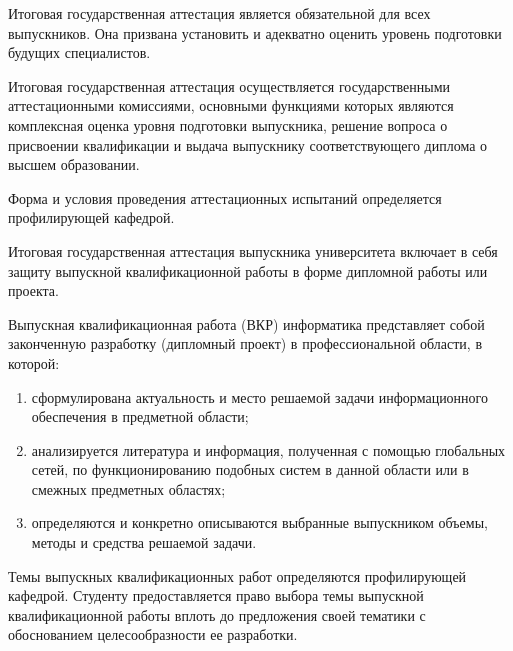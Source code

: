 \documentclass[14pt]{extarticle} %
\begin{document}
	

\renewcommand{\baselinestretch}{1.5}
\normalsize
\renewcommand{\contentsname}{СОДЕРЖАНИЕ}
\noindent\tableofcontents


Итоговая государственная аттестация является обязательной для всех выпускников. 
Она призвана установить и адекватно оценить уровень подготовки будущих 
специалистов.

Итоговая государственная аттестация осуществляется государственными аттестационными 
комиссиями, основными функциями которых являются комплексная оценка уровня 
подготовки выпускника, решение вопроса о присвоении квалификации и выдача 
выпускнику соответствующего диплома о высшем образовании.

Форма и условия проведения аттестационных испытаний определяется профилирующей кафедрой.

Итоговая государственная аттестация выпускника университета включает в себя
защиту выпускной квалификационной работы в форме дипломной работы или проекта.

\setlength{\itemsep}{0mm}
Выпускная квалификационная работа (ВКР) информатика 
представляет собой законченную разработку (дипломный проект) в профессиональной области, 
в которой: 

\begin{enumerate}[label=\arabic*)]  
\item сформулирована актуальность и место решаемой задачи 
информационного обеспечения в предметной области;
\item анализируется литература и информация, полученная с помощью 
глобальных сетей, по функционированию подобных систем в данной области 
или в смежных предметных областях; 
\item определяются и конкретно описываются выбранные выпускником объемы, 
методы и средства решаемой задачи.
\end{enumerate}


Темы выпускных квалификационных работ определяются профилирующей кафедрой. 
Студенту предоставляется право выбора темы выпускной квалификационной работы 
вплоть до предложения своей тематики с обоснованием целесообразности ее разработки.
\end{document}

